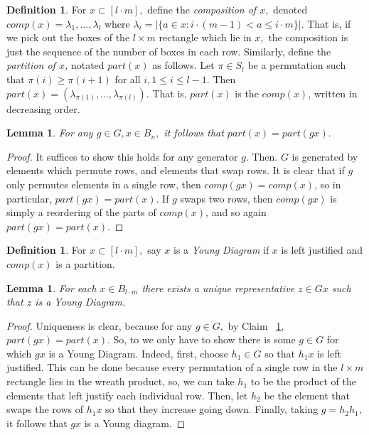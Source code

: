 \documentclass[10 pt]{amsart}
\theoremstyle{plain}
\newtheorem{lem}[thm]{Lemma}
\theoremstyle{definition}
\newtheorem{defn}[thm]{Definition}
\theoremstyle{remark}
\numberwithin{equation}{section}
\begin{document}
\begin{defn}
For $x \subset [l\cdot m],$ define the {\it composition of $x,$} denoted $comp(x) = \lambda_1 ,\ldots, \lambda_l$ where $\lambda_i = |\{a \in x:i\cdot (m-1)< a \leq i \cdot m\}|.$ That is, if we pick out the boxes of the $l \times m$ rectangle which lie in $x,$ the composition is just the sequence of the number of boxes in each row. Similarly, define the {\it partition of $x$,} notated $part(x)$ as follows. Let $\pi \in S_l$ be a permutation such that $\pi(i) \geq \pi(i+1)$ for all $i,1\leq i \leq l-1.$ Then  $part(x) = (\lambda_{\pi(1)},\ldots, \lambda_{\pi(l)}).$ That is, $part(x)$ is the $comp(x)$, written in decreasing order.
\end{defn}

\begin{lem}
\label{lem:comp_invariance}
For any $g \in G, x \in B_n,$ it follows that $part(x) = part(gx).$
\end{lem}
\begin{proof}
It suffices to show this holds for any generator $g.$ Then. $G$ is generated by elements which permute rows, and elements that swap rows. It is clear that if $g$ only permutes elements in a single row, then $comp(gx) = comp(x)$, so in particular, $part(gx) = part(x).$ If $g$ swaps two rows, then $comp(gx)$ is simply a reordering of the parts of $comp(x)$, and so again $part(gx) = part(x).$
\end{proof}

\begin{defn}
For $x \subset [l\cdot m],$ say $x$ is a {\it Young Diagram} if $x$ is left justified and $comp(x)$ is a partition.
\end{defn}

\begin{lem}
\label{lem:young_diag_reps}
For each $x \in B_{l\cdot m}$ there exists a unique representative $z \in Gx$ such that $z$ is a Young Diagram.
\end{lem}
\begin{proof}
Uniqueness is clear, because for any $g \in G,$ by Claim ~\ref{lem:comp_invariance}, $part(gx) = part(x).$ So, to we only have to show there is some $g \in G$ for which $gx$ is a Young Diagram. Indeed, first, choose $h_1 \in G$ so that $h_1x$ is left justified. This can be done because every permutation of a single row in the $l\times m$ rectangle lies in the wreath product, so, we can take $h_1$ to be the product of the elements that left justify each individual row. Then, let $h_2$ be the element that swaps the rows of $h_1x$ so that they increase going down. Finally, taking $g = h_2 h_1,$ it follows that $gx$ is a Young diagram. 
\end{proof}
\end{document}
